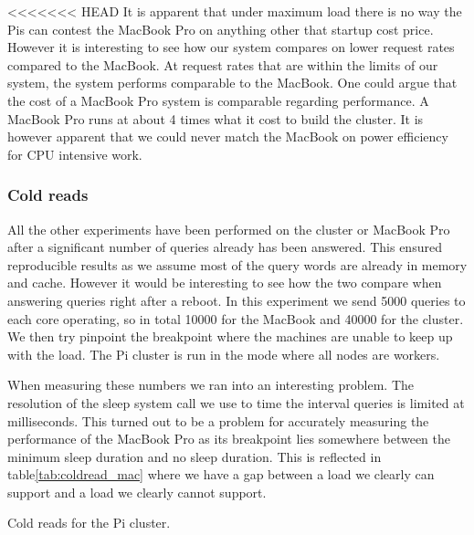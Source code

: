 <<<<<<< HEAD
It is apparent that under maximum load there is no way the Pis can contest the MacBook Pro on anything other that startup cost price.
However it is interesting to see how our system compares on lower request rates compared to the MacBook. 
At request rates that are within the limits of our system, the system performs comparable to the MacBook. One could argue that the cost of a MacBook Pro system is comparable regarding performance. A MacBook Pro runs at about 4 times what it cost to build the cluster. It is however apparent that we could never match the MacBook on power efficiency for CPU intensive work.

\subsubsection{Cold reads}
\label{sec:coldread}

All the other experiments have been performed on the cluster or MacBook Pro after a significant number of queries already has been answered. This ensured reproducible results as we assume most of the query words are already in memory and cache. However it would be interesting to see how the two compare when answering queries right after a reboot.  In this experiment we send 5000 queries to each core operating, so in total 10000 for the MacBook and 40000 for the cluster. We then try pinpoint the breakpoint where the machines are unable to keep up with the load. The Pi cluster is run in the mode where all nodes are workers.

When measuring these numbers we ran into an interesting problem. The resolution of the sleep system call we use to time the interval queries is limited at milliseconds. This turned out to be a problem for accurately measuring the performance of the MacBook Pro as its breakpoint lies somewhere between the minimum sleep duration and no sleep duration. This is reflected in table\ref{tab:coldread_mac} where we have a gap between a load we clearly can support and a load we clearly cannot support.

\begin{table}[h]
	\coldreadpi
	\centering
	\pgfplotstabletypeset[
     	columns={orps, oanswers},
     	every head row/.style={after row=\hline},
		every last row/.style={after row=\hline},
		columns/orps/.style={column name=Queries per second},
		columns/oanswers/.style={column name=\% queries served},
     	]
    {\coldreadpi}
    \caption{Cold reads for the Pi cluster.}
\label{tab:coldread_pi}
\end{table}

